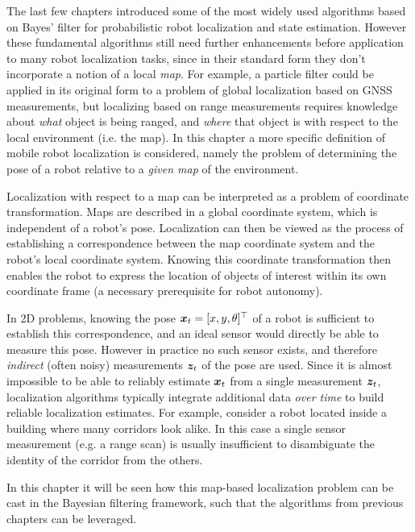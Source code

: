 The last few chapters introduced some of the most widely used algorithms based on Bayes' filter for probabilistic robot localization and state estimation. However these fundamental algorithms still need further enhancements before application to many robot localization tasks, since in their standard form they don't incorporate a notion of a local \textit{map}. For example, a particle filter could be applied in its original form to a problem of global localization based on GNSS measurements, but localizing based on range measurements requires knowledge about \textit{what} object is being ranged, and \textit{where} that object is with respect to the local environment (i.e. the map).
In this chapter a more specific definition of mobile robot localization is considered\cite{ThrunBurgardEtAl2005}, namely the problem of determining the pose of a robot relative to a \textit{given map} of the environment.

Localization with respect to a map can be interpreted as a problem of coordinate transformation. Maps are described in a global coordinate system, which is independent of a robot’s pose. Localization can then be viewed as the process of establishing a correspondence between the map coordinate system and the robot’s local coordinate system. Knowing this coordinate transformation then enables the robot to express the location of objects of interest within its own coordinate frame (a necessary prerequisite for robot autonomy).


In 2D problems, knowing the pose $\bm{x}_t = [x, y, \theta]^\top $ of a robot is sufficient to establish this correspondence, and an ideal sensor would directly be able to measure this pose. However in practice no such sensor exists, and therefore \textit{indirect} (often noisy) measurements $\bm{z}_t$ of the pose are used. Since it is almost impossible to be able to reliably estimate $\bm{x}_t$ from a single measurement $\bm{z}_t$, localization algorithms typically integrate additional data \textit{over time} to build reliable localization estimates. For example, consider a robot located inside a building where many corridors look alike. In this case a single sensor measurement (e.g. a range scan) is usually insufficient to disambiguate the identity of the corridor from the others.

In this chapter it will be seen how this map-based localization problem can be cast in the Bayesian filtering framework, such that the algorithms from previous chapters can be leveraged.


